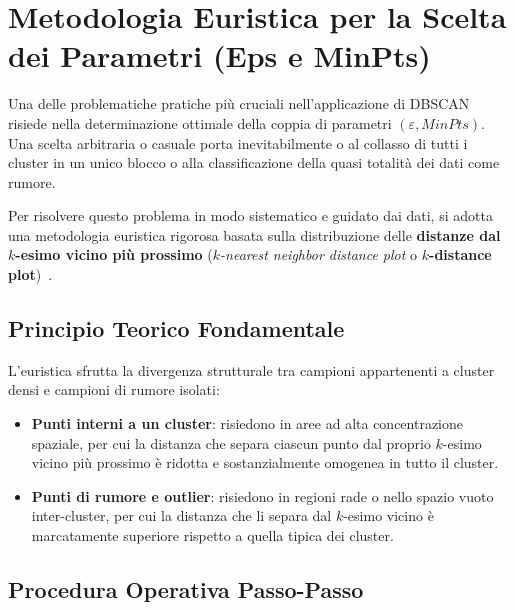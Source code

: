 \FloatBarrier
\section{Metodologia Euristica per la Scelta dei Parametri (Eps e MinPts)}
\label{sec:dm-dbscan-parameter-selection}

Una delle problematiche pratiche più cruciali nell'applicazione di DBSCAN risiede nella determinazione ottimale della coppia di parametri $(\varepsilon, MinPts)$. Una scelta arbitraria o casuale porta inevitabilmente o al collasso di tutti i cluster in un unico blocco o alla classificazione della quasi totalità dei dati come rumore.

Per risolvere questo problema in modo sistematico e guidato dai dati, si adotta una metodologia euristica rigorosa basata sulla distribuzione delle \textbf{distanze dal $k$-esimo vicino più prossimo} (\textit{$k$-nearest neighbor distance plot} o \textbf{$k$-distance plot})~\cite{ester1996, tan2018}.

\FloatBarrier
\subsection{Principio Teorico Fondamentale}

L'euristica sfrutta la divergenza strutturale tra campioni appartenenti a cluster densi e campioni di rumore isolati:
\begin{itemize}
    \item \textbf{Punti interni a un cluster}: risiedono in aree ad alta concentrazione spaziale, per cui la distanza che separa ciascun punto dal proprio $k$-esimo vicino più prossimo è ridotta e sostanzialmente omogenea in tutto il cluster.
    \item \textbf{Punti di rumore e outlier}: risiedono in regioni rade o nello spazio vuoto inter-cluster, per cui la distanza che li separa dal $k$-esimo vicino è marcatamente superiore rispetto a quella tipica dei cluster.
\end{itemize}

\FloatBarrier
\subsection{Procedura Operativa Passo-Passo}

